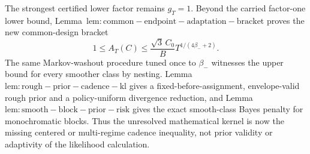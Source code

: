 The strongest certified lower factor remains \(g_T=1\). Beyond the carried factor-one lower bound, Lemma~\(\mathrm{lem:common-endpoint-adaptation-bracket}\) proves the new common-design bracket \[1\le A_T(C)\le \frac{\sqrt3\,C_0}{B}T^{1/(4\beta_-+2)}.\] The same Markov-washout procedure tuned once to \(\beta_-\) witnesses the upper bound for every smoother class by nesting. Lemma~\(\mathrm{lem:rough-prior-cadence-kl}\) gives a fixed-before-assignment, envelope-valid rough prior and a policy-uniform divergence reduction, and Lemma~\(\mathrm{lem:smooth-block-prior-risk}\) gives the exact smooth-class Bayes penalty for monochromatic blocks. Thus the unresolved mathematical kernel is now the missing centered or multi-regime cadence inequality, not prior validity or adaptivity of the likelihood calculation.